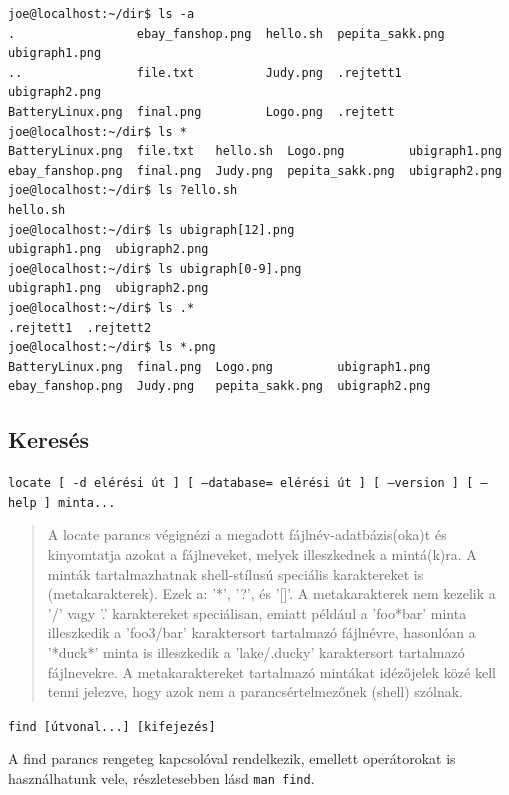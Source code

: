 \begin{lstlisting}
joe@localhost:~/dir$ ls -a
.                 ebay_fanshop.png  hello.sh  pepita_sakk.png  ubigraph1.png
..                file.txt          Judy.png  .rejtett1        ubigraph2.png
BatteryLinux.png  final.png         Logo.png  .rejtett
joe@localhost:~/dir$ ls *
BatteryLinux.png  file.txt   hello.sh  Logo.png         ubigraph1.png
ebay_fanshop.png  final.png  Judy.png  pepita_sakk.png  ubigraph2.png
joe@localhost:~/dir$ ls ?ello.sh
hello.sh
joe@localhost:~/dir$ ls ubigraph[12].png
ubigraph1.png  ubigraph2.png
joe@localhost:~/dir$ ls ubigraph[0-9].png
ubigraph1.png  ubigraph2.png
joe@localhost:~/dir$ ls .*
.rejtett1  .rejtett2
joe@localhost:~/dir$ ls *.png
BatteryLinux.png  final.png  Logo.png         ubigraph1.png
ebay_fanshop.png  Judy.png   pepita_sakk.png  ubigraph2.png
\end{lstlisting}


\subsection{Keresés}
\medskip

\hfill\texttt{locate [ -d   elérési út  ] [ --database=  elérési út  ] [ --version ] [ --help ] minta...}
\medskip

\begin{quotation}
\small
A locate parancs végignézi a megadott fájlnév-adatbázis(oka)t és kinyomtatja azokat a fájl\-ne\-ve\-ket, melyek illeszkednek a mintá(k)ra. A minták tartalmazhatnak shell-stílusú speciális karaktereket is (metakarakterek). Ezek a: '*', '?', és '[]'. A metakarakterek nem kezelik a '/' vagy '.' karaktereket speciálisan, emiatt például a 'foo*bar' minta illeszkedik a 'foo3/bar' karaktersort tartalmazó fájlnévre, hasonlóan a '*duck*' minta is illeszkedik a 'lake/.ducky' karaktersort tartalmazó fájlnevekre. A metakaraktereket tartalmazó mintákat idézőjelek közé kell tenni jelezve, hogy azok nem a parancsértelmezőnek (shell) szólnak. 
\end{quotation}

\noindent{}
	\medskip

	\hfill\texttt{find [útvonal...] [kifejezés] }\medskip


A find parancs rengeteg kapcsolóval rendelkezik, emellett operátorokat is használhatunk vele, részletesebben lásd \texttt{man find}.
\bigskip

